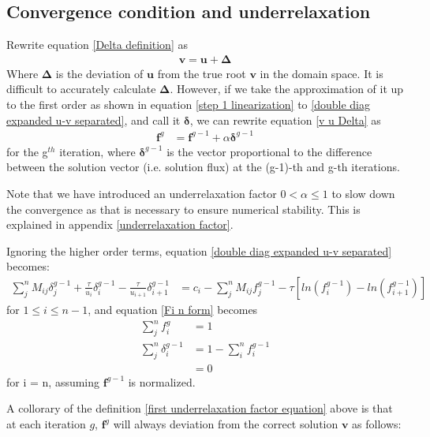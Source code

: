 \documentclass[a4paper, 12pt]{article}
\newcommand{\ve}[1]{\boldsymbol{#1}}
\begin{document}
\subsection{Convergence condition and underrelaxation}

Rewrite equation \ref{Delta definition} as
\begin{align}
    \ve{v} = \ve{u} + \ve{\Delta}
    \label{v u Delta}
\end{align}
Where $\ve{\Delta}$ is the deviation of $\ve{u}$ from the true root $\ve{v}$ in the domain space.
It is difficult to accurately calculate $\ve{\Delta}$. However, if we take the approximation of it up to the first order as shown in equation \ref{step 1 linearization} to \ref{double diag expanded u-v separated}, and call it $\ve{\delta}$, we can rewrite equation \ref{v u Delta} as 
\begin{align}
    \ve{f}^g &= \ve{f}^{g-1} + \alpha \ve{\delta}^{g-1}
    \label{first underrelaxation factor equation}
\end{align}
    for the g$^{th}$ iteration, where $\ve{\delta}^{g-1}$ is the vector proportional to the difference between the solution vector (i.e. solution flux) at the (g-1)-th and g-th iterations.

Note that we have introduced an underrelaxation factor $0< \alpha \le 1$ to slow down the convergence as that is necessary to ensure numerical stability. This is explained in appendix \ref{underrelaxation factor}.

Ignoring the higher order terms, equation \ref{double diag expanded u-v separated} becomes:
\begin{align}
    \sum_j^n M_{ij}\delta^{g-1}_j + \frac{\tau}{u_i}\delta^{g-1}_i - \frac{\tau}{u_{i+1}}\delta^{g-1}_{i+1}
    &= c_i - \sum_j^n M_{ij} f^{g-1}_j - \tau [ln(f^{g-1}_i)-ln(f^{g-1}_{i+1})]
    \label{double diag expanded fgfg-1}
\end{align}
for $1 \le i\le n-1$,
and equation \ref{Fi n form} becomes
\begin{align}
    \sum_j^n f^g_i &= 1 \\
    \sum_j^n \delta^{g-1}_i &=1- \sum_i^n f^{g-1}_i \label{delta equals f-1}\\
                            &= 0 \label{delta keeps f normalized}
\end{align}
for i = n, assuming $\ve{f}^{g-1}$ is normalized.

A collorary of the definition \ref{first underrelaxation factor equation} above is that at each iteration $g$, $\ve{f}^g$ will always deviation from the correct solution $\ve{v}$ as follows:
\end{document}
